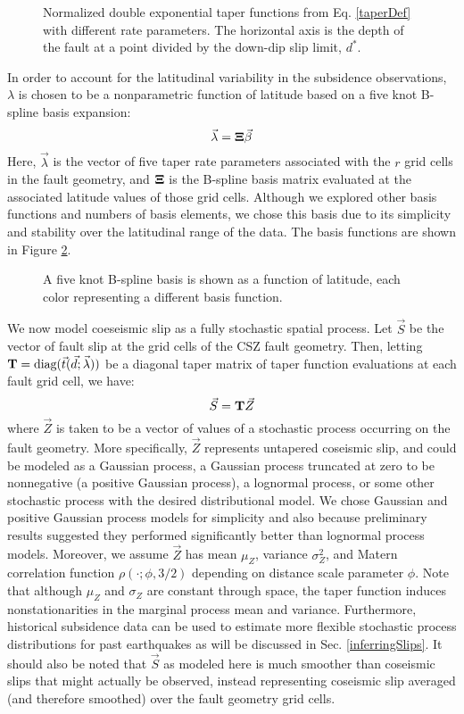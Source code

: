 {\begin{figure}
\centering
{}
\caption{Normalized double exponential taper functions from Eq. \ref{taperDef} with different rate parameters.  The horizontal axis is the depth of the fault at a point divided by the down-dip slip limit, $d^*$.}
\label{taper}
\end{figure}

In order to account for the latitudinal variability in the subsidence observations, $\lambda$ is chosen to be a nonparametric function of latitude based on a five knot B-spline basis expansion:
$$ \vec{\lambda} = \mathbf{\Xi} \vec{\beta} $$
Here, $\vec{\lambda}$ is the vector of five taper rate parameters associated with the $r$ grid cells in the fault geometry, and $\mathbf{\Xi}$ is the B-spline basis matrix evaluated at the associated latitude values of those grid cells.  Although we explored other basis functions and numbers of basis elements, we chose this basis due to its simplicity and stability over the latitudinal range of the data.  The basis functions are shown in Figure \ref{splineBasis}.

\begin{figure}
\centering
{}
\caption{A five knot B-spline basis is shown as a function of latitude, each color representing a different basis function.}
\label{splineBasis}
\end{figure}

We now model coeseismic slip as a fully stochastic spatial process.  Let $\vec{S}$ be the vector of fault slip at the grid cells of the CSZ fault geometry.  Then, letting $\mathbf{T} = \text{diag}(\vec{t}(\vec{d}; \vec{\lambda}))$ be a diagonal taper matrix of taper function evaluations at each fault grid cell, we have:
$$ \vec{S} = \mathbf{T} \vec{Z} $$
where $\vec{Z}$ is taken to be a vector of values of a stochastic process occurring on the fault geometry.  More specifically, $\vec{Z}$ represents untapered coseismic slip, and could be modeled as a Gaussian process, a Gaussian process truncated at zero to be nonnegative (a positive Gaussian process), a lognormal process, or some other stochastic process with the desired distributional model.  We chose Gaussian and positive Gaussian process models for simplicity and also because preliminary results suggested they performed significantly better than lognormal process models.  Moreover, we assume $\vec{Z}$ has mean $\mu_Z$, variance $\sigma_Z^2$, and Matern correlation function $\rho(\cdot ; \phi, 3/2)$ depending on distance scale parameter $\phi$.  Note that although $\mu_Z$ and $\sigma_Z$ are constant through space, the taper function induces nonstationarities in the marginal process mean and variance.  Furthermore, historical subsidence data can be used to estimate more flexible stochastic process distributions for past earthquakes as will be discussed in Sec. \ref{inferringSlips}.  It should also be noted that $\vec{S}$ as modeled here is much smoother than coseismic slips that might actually be observed, instead representing coseismic slip averaged (and therefore smoothed) over the fault geometry grid cells.

}
